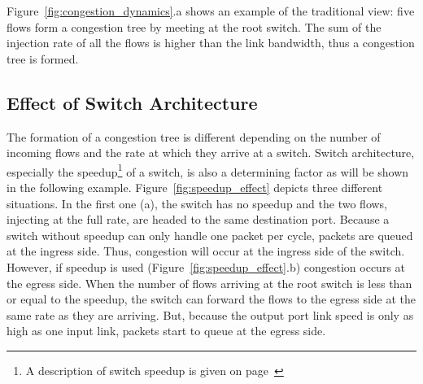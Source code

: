 \documentclass[12pt]{article}
\begin{document}
Figure~\ref{fig:congestion_dynamics}.a shows an example of the traditional view: five flows form a congestion tree by meeting at the root switch. The sum of the injection rate of all the flows is higher than the link bandwidth, thus a congestion tree is formed.

\subsection{Effect of Switch Architecture}\label{S:switch_arch}

The formation of a congestion tree is different depending on the number of incoming flows and the rate at which they arrive at a switch. Switch architecture, especially the speedup\footnote{A description of switch speedup is given on page~\pageref{desc:switch_speedup}} of a switch, is also a determining factor as will be shown in the following example. Figure~\ref{fig:speedup_effect} depicts three different situations. In the first one (a), the switch has no speedup and the two flows, injecting at the full rate, are headed to the same destination port. Because a switch without speedup can only handle one packet per cycle, packets are queued at the ingress side. Thus, congestion will occur at the ingress side of the switch. However, if speedup is used (Figure~\ref{fig:speedup_effect}.b) congestion occurs at the egress side. When the number of flows arriving at the root switch is less than or equal to the speedup, the switch can forward the flows to the egress side at the same rate as they are arriving. But, because the output port link speed is only as high as one input link, packets start to queue at the egress side. 
\end{document}
